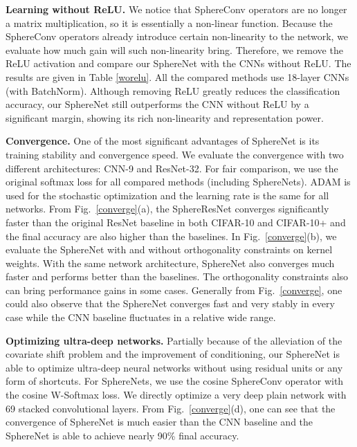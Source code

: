 \par
\textbf{Learning without ReLU.} We notice that SphereConv operators are no longer a matrix multiplication, so it is essentially a non-linear function. Because the SphereConv operators already introduce certain non-linearity to the network, we evaluate how much gain will such non-linearity bring. Therefore, we remove the ReLU activation and compare our SphereNet with the CNNs without ReLU. The results are given in Table \ref{worelu}. All the compared methods use 18-layer CNNs (with BatchNorm). Although removing ReLU greatly reduces the classification accuracy, our SphereNet still outperforms the CNN without ReLU by a significant margin, showing its rich non-linearity and representation power.

\par

\textbf{Convergence.} One of the most significant advantages of SphereNet is its training stability and convergence speed. We evaluate the convergence with two different architectures: CNN-9 and ResNet-32. For fair comparison, we use the original softmax loss for all compared methods (including SphereNets). ADAM is used for the stochastic optimization and the learning rate is the same for all networks. From Fig.~\ref{converge}(a), the SphereResNet converges significantly faster than the original ResNet baseline in both CIFAR-10 and CIFAR-10+ and the final accuracy are also higher than the baselines. In Fig.~\ref{converge}(b), we evaluate the SphereNet with and without orthogonality constraints on kernel weights. With the same network architecture, SphereNet also converges much faster and performs better than the baselines. The orthogonality constraints also can bring performance gains in some cases. Generally from Fig.~\ref{converge}, one could also observe that the SphereNet converges fast and very stably in every case while the CNN baseline fluctuates in a relative wide range.

\par
\textbf{Optimizing ultra-deep networks.} Partially because of the alleviation of the covariate shift problem and the improvement of conditioning, our SphereNet is able to optimize ultra-deep neural networks without using residual units or any form of shortcuts. For SphereNets, we use the cosine SphereConv operator with the cosine W-Softmax loss. We directly optimize a very deep plain network with 69 stacked convolutional layers. From Fig.~\ref{converge}(d), one can see that the convergence of SphereNet is much easier than the CNN baseline and the SphereNet is able to achieve nearly 90\% final accuracy.

